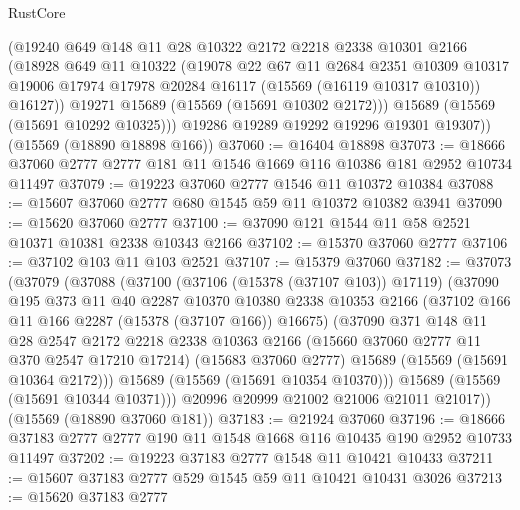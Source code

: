 \begin{lexlean}{RustCore}
\begin{coremodule}
          (@19240
            @649
            @148
            @11
            @28
            @10322
            @2172
            @2218
            @2338
            @10301
            @2166
            (@18928
              @649
              @11
              @10322
              (@19078
                @22
                @67
                @11
                @2684
                @2351
                @10309
                @10317
                @19006
                @17974
                @17978
                @20284
                @16117
                (@15569 (@16119 @10317 @10310))
                @16127))
            @19271
            @15689
            (@15569 (@15691 @10302 @2172)))
          @15689
          (@15569 (@15691 @10292 @10325)))
        @19286
        @19289
        @19292
        @19296
        @19301
        @19307))
    (@15569 (@18890 @18898 @166))
@37060 := @16404 @18898
@37073 := @18666 @37060 @2777 @2777 @181 @11 @1546 @1669 @116 @10386 @181 @2952 @10734 @11497
@37079 := @19223 @37060 @2777 @1546 @11 @10372 @10384
@37088 := @15607 @37060 @2777 @680 @1545 @59 @11 @10372 @10382 @3941
@37090 := @15620 @37060 @2777
@37100 := @37090 @121 @1544 @11 @58 @2521 @10371 @10381 @2338 @10343 @2166
@37102 := @15370 @37060 @2777
@37106 := @37102 @103 @11 @103 @2521
@37107 := @15379 @37060
@37182 := @37073
    (@37079
      (@37088
        (@37100
          (@37106 (@15378 (@37107 @103)) @17119)
          (@37090
            @195
            @373
            @11
            @40
            @2287
            @10370
            @10380
            @2338
            @10353
            @2166
            (@37102 @166 @11 @166 @2287 (@15378 (@37107 @166)) @16675)
            (@37090
              @371
              @148
              @11
              @28
              @2547
              @2172
              @2218
              @2338
              @10363
              @2166
              (@15660 @37060 @2777 @11 @370 @2547 @17210 @17214)
              (@15683 @37060 @2777)
              @15689
              (@15569 (@15691 @10364 @2172)))
            @15689
            (@15569 (@15691 @10354 @10370)))
          @15689
          (@15569 (@15691 @10344 @10371)))
        @20996
        @20999
        @21002
        @21006
        @21011
        @21017))
    (@15569 (@18890 @37060 @181))
@37183 := @21924 @37060
@37196 := @18666 @37183 @2777 @2777 @190 @11 @1548 @1668 @116 @10435 @190 @2952 @10733 @11497
@37202 := @19223 @37183 @2777 @1548 @11 @10421 @10433
@37211 := @15607 @37183 @2777 @529 @1545 @59 @11 @10421 @10431 @3026
@37213 := @15620 @37183 @2777

\end{coremodule}
\end{lexlean}
